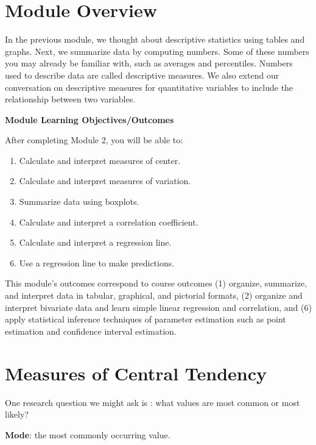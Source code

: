 \documentclass[
]{book}
\providecommand{\tightlist}{%
  \setlength{\itemsep}{0pt}\setlength{\parskip}{0pt}}
\begin{document}
\hypertarget{module-overview-1}{%
\section{Module Overview}\label{module-overview-1}}

In the previous module, we thought about descriptive statistics using tables and graphs. Next, we summarize data by computing numbers. Some of these numbers you may already be familiar with, such as averages and percentiles. Numbers used to describe data are called descriptive measures. We also extend our conversation on descriptive measures for quantitative variables to include the relationship between two variables.

\textbf{Module Learning Objectives/Outcomes}

After completing Module 2, you will be able to:

\begin{enumerate}
\def\labelenumi{\arabic{enumi}.}
\tightlist
\item
  Calculate and interpret measures of center.
\item
  Calculate and interpret measures of variation.
\item
  Summarize data using boxplots.
\item
  Calculate and interpret a correlation coefficient.
\item
  Calculate and interpret a regression line.
\item
  Use a regression line to make predictions.
\end{enumerate}

This module's outcomes correspond to course outcomes (1) organize, summarize, and interpret data in tabular, graphical, and pictorial formats, (2) organize and interpret bivariate data and learn simple linear regression and correlation, and (6) apply statistical inference techniques of parameter estimation such as point estimation and confidence interval estimation.

\hypertarget{measures-of-central-tendency}{%
\section{Measures of Central Tendency}\label{measures-of-central-tendency}}

One research question we might ask is : what values are most common or most likely?

\textbf{Mode}: the most commonly occurring value.
\end{document}
